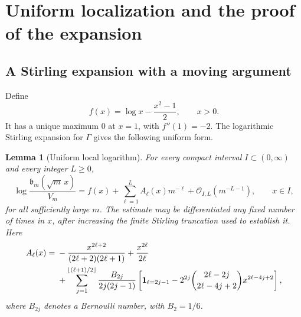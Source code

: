 \documentclass[11pt,a4paper]{article}
\numberwithin{equation}{section}
\newtheorem{lemma}[theorem]{Lemma}
\theoremstyle{definition}
\newcommand{\bcont}{\mathfrak b}
\newcommand{\OO}{\mathcal O}
\newcommand{\ind}{\mathbf 1}
\begin{document}
\section{Uniform localization and the proof of the expansion}\label{tbs:sec:proof}

\subsection{A Stirling expansion with a moving argument}
Define
\begin{equation}\label{tbs:eq:f}
 f(x)=\log x-\frac{x^2-1}{2},\qquad x>0.
\end{equation}
It has a unique maximum $0$ at $x=1$, with $f''(1)=-2$.
The logarithmic Stirling expansion for $\Gamma$ gives the following
uniform form.

\begin{lemma}[Uniform local logarithm]\label{tbs:lem:stirling}
For every compact interval $I\subset(0,\infty)$ and every integer $L\ge0$,
\begin{equation}\label{tbs:eq:log-stirling}
 \log\frac{\bcont_m(\sqrt m\,x)}{V_m}
 =f(x)+\sum_{\ell=1}^{L}A_\ell(x)m^{-\ell}
       +\OO_{I,L}(m^{-L-1}),\qquad x\in I,
\end{equation}
for all sufficiently large $m$. The estimate may be differentiated any
fixed number of times in $x$, after increasing the finite Stirling
truncation used to establish it. Here
\begin{align}\label{tbs:eq:Aformula}
 A_\ell(x)={}&-\frac{x^{2\ell+2}}{(2\ell+2)(2\ell+1)}
              +\frac{x^{2\ell}}{2\ell}\notag\\
 &+\sum_{j=1}^{\lfloor(\ell+1)/2\rfloor}
 \frac{B_{2j}}{2j(2j-1)}
 \left[
 \ind_{\ell=2j-1}
 -2^{2j}\binom{2\ell-2j}{2\ell-4j+2}
                      x^{2\ell-4j+2}
 \right],
\end{align}
where $B_{2j}$ denotes a Bernoulli number, with $B_2=1/6$.
\end{lemma}
\end{document}
